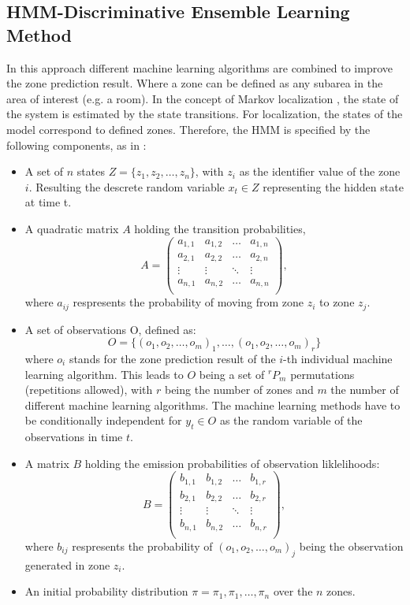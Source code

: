 \subsection{HMM-Discriminative Ensemble Learning Method}
In this approach different machine learning algorithms are combined to improve the zone prediction result. Where a zone can be defined as any subarea in the area of interest (e.g. a room). In the concept of Markov localization \cite{Markov}, the state of the system is estimated by the state transitions. For localization, the states of the model correspond to defined zones.
Therefore, the HMM is specified by the following components, as in \cite{Carrera2}:
\begin{itemize}
\item A set of $n$ states $Z=\{z_{1}, z_{2},\dots,z_{n}\}$, with $z_{i}$ as the identifier value of the zone $i$. Resulting the descrete random variable $x_{t} \in Z$ representing the hidden state at time t.
\item A quadratic matrix $A$ holding the transition probabilities,
\begin{equation*}
A = 
\begin{pmatrix}
   a_{1,1} & a_{1,2} & \dots & a_{1,n}\\
   a_{2,1} & a_{2,2} & \dots & a_{2,n}\\
    \vdots & \vdots & \ddots & \vdots  \\
   a_{n,1} & a_{n,2} & \dots & a_{n,n}\\
\end{pmatrix},
\end{equation*}
where $a_{ij}$ respresents the probability of moving from zone $z_{i}$ to zone $z_{j}$.
\item A set of observations O, defined as:
$$O = \{(o_{1},o_{2},\dots,o_{m})_1, \dots, (o_{1},o_{2},\dots,o_{m})_r\}$$
where $o_{i}$ stands for the zone prediction result of the $i$-th individual machine learning algorithm. This leads to $O$ being a set of $^rP_m$ permutations (repetitions allowed), with $r$ being the number of zones and $m$ the number of different machine learning algorithms. The machine learning methods have to be conditionally independent for $y_{t} \in O$ as the random variable of the observations in time $t$.
\item A matrix $B$ holding the emission probabilities of observation liklelihoods:
\begin{equation*}
B = 
\begin{pmatrix}
   b_{1,1} & b_{1,2} & \dots & b_{1,r}\\
   b_{2,1} & b_{2,2} & \dots & b_{2,r}\\
    \vdots & \vdots & \ddots & \vdots  \\
   b_{n,1} & b_{n,2} & \dots & b_{n,r}\\
\end{pmatrix},
\end{equation*}
where $b_{ij}$ respresents the probability of $(o_{1},o_{2}, \dots, o_{m})_j$ being the observation generated in zone $z_{i}$.
\item An initial probability distribution $\pi = \pi_{1},\pi_{1},\dots, \pi_{n}$ over the $n$ zones.
\end{itemize}
